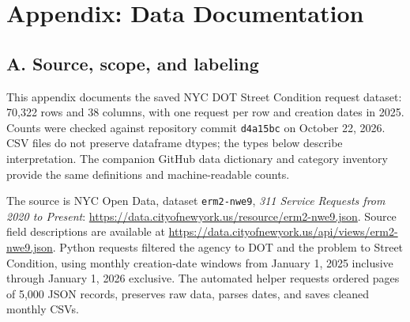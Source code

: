 \section*{Appendix: Data Documentation}
\begingroup
\small
\sloppy
\setlength{\tabcolsep}{4pt}
\renewcommand{\arraystretch}{1.16}
\subsection*{A. Source, scope, and labeling}
This appendix documents the saved NYC DOT Street Condition request dataset: 70,322 rows and 38 columns, with one request per row and creation dates in 2025. Counts were checked against repository commit \texttt{d4a15bc} on October 22, 2026. CSV files do not preserve dataframe dtypes; the types below describe interpretation. The companion GitHub data dictionary and category inventory provide the same definitions and machine-readable counts.

The source is NYC Open Data, dataset \texttt{erm2-nwe9}, \emph{311 Service Requests from 2020 to Present}: \url{https://data.cityofnewyork.us/resource/erm2-nwe9.json}. Source field descriptions are available at \url{https://data.cityofnewyork.us/api/views/erm2-nwe9.json}. Python requests filtered the agency to DOT and the problem to Street Condition, using monthly creation-date windows from January 1, 2025 inclusive through January 1, 2026 exclusive. The automated helper requests ordered pages of 5,000 JSON records, preserves raw data, parses dates, and saves cleaned monthly CSVs.

